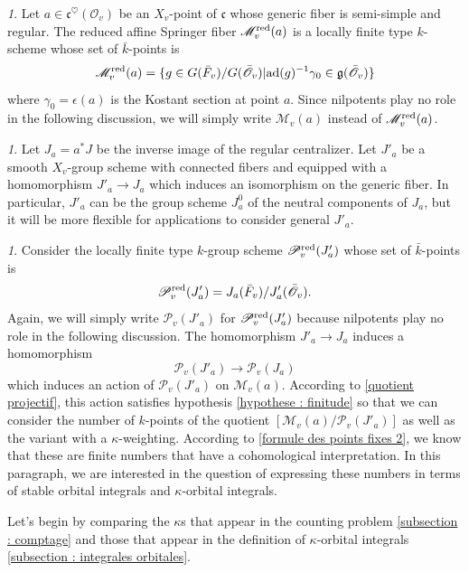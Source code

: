 \documentclass[12pt,english]{smfart}
\numberwithin{equation}{subsection}
\theoremstyle{remark}
\newtheorem{numero}[equation]{}
\newcommand\calP{{\mathscr P}}
\newcommand\calM{{\mathscr M}}
\newcommand\calO{{\mathscr O}}
\newcommand\frakg{{\mathfrak g}}
\newcommand\frakc{{\mathfrak c}}
\newcommand\ad{{\rm ad}}
\begin{document}
\begin{numero}
Let $a\in\frakc^\heartsuit(\calO_v)$ be an $X_v$-point of $\frakc$ whose
generic fiber is semi-simple and regular. The reduced affine Springer
fiber $\calM_v^{\rm red}(a)$ is a locally finite type $k$-scheme whose
set of $\bar k$-points is
$$\calM_v^{\rm red}(a)=\{g\in G(\bar F_v)/G(\bar \calO_v)| \ad(g)^{-1}\gamma_0 \in
\frakg(\bar \calO_v)\}
$$
where $\gamma_0=\epsilon(a)$ is the Kostant section at point $a$.
Since nilpotents play no role in the following discussion, we will
simply write $\calM_v(a)$ instead of $\calM_v^{\rm red}(a)$.
\end{numero}

\begin{numero}
Let $J_a=a^* J$ be the inverse image of the regular centralizer. Let $J'_a$ be a
smooth $X_v$-group scheme with connected fibers and equipped with a
homomorphism $J'_a\rightarrow J_a$ which induces an isomorphism on the
generic fiber. In particular, $J'_a$ can be the group scheme
$J_a^0$ of the neutral components of $J_a$, but it will be more flexible for
applications to consider general $J'_a$.
\end{numero}

\begin{numero}
Consider the locally finite type $k$-group scheme
$\calP_v^{\rm red}(J'_a)$ whose set of $\bar k$-points is
$$\calP_v^{\rm red}(J'_a)= J_a(\bar F_v)/J'_a(\bar \calO_v).$$
Again, we will simply write $\calP_v(J'_a)$ for $\calP_v^{\rm
red}(J'_a)$ because nilpotents play no role in the following discussion.
The homomorphism $J'_a\rightarrow J_a$ induces a homomorphism
$$\calP_v(J'_a)\rightarrow \calP_v(J_a)$$
which induces an action of $\calP_v(J'_a)$ on $\calM_v(a)$. According to
\ref{quotient projectif}, this action satisfies hypothesis \ref{hypothese :
finitude} so that we can consider the number of $k$-points of the quotient
$[\calM_v(a)/\calP_v(J'_a)]$ as well as the variant with a
$\kappa$-weighting. According to \ref{formule des points fixes 2}, we know
that these are finite numbers that have a cohomological interpretation.
In this paragraph, we are interested in the question of expressing these
numbers in terms of stable orbital integrals and
$\kappa$-orbital integrals.
\end{numero}

Let's begin by comparing the $\kappa$s that appear in the
counting problem \ref{subsection : comptage} and those that
appear in the definition of $\kappa$-orbital integrals
\ref{subsection : integrales orbitales}.
\end{document}
